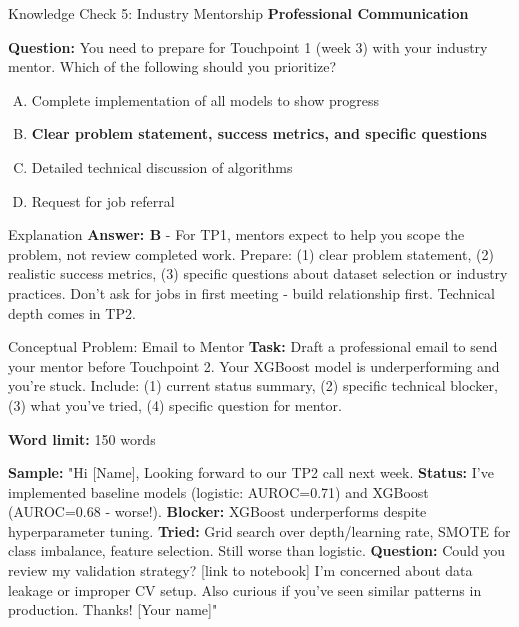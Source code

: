 
\begin{frame}{Knowledge Check 5: Industry Mentorship}
\textbf{Professional Communication}

\vspace{0.3cm}

\textbf{Question:} You need to prepare for Touchpoint 1 (week 3) with your industry mentor. Which of the following should you prioritize?

\begin{enumerate}[A)]
\item Complete implementation of all models to show progress
\item \textcolor{forest}{\textbf{Clear problem statement, success metrics, and specific questions}}
\item Detailed technical discussion of algorithms
\item Request for job referral
\end{enumerate}

\pause

\begin{block}{Explanation}
\textcolor{forest}{\textbf{Answer: B}} - For TP1, mentors expect to help you scope the problem, not review completed work. Prepare: (1) clear problem statement, (2) realistic success metrics, (3) specific questions about dataset selection or industry practices. Don't ask for jobs in first meeting - build relationship first. Technical depth comes in TP2.
\end{block}

\pause

\vspace{0.2cm}

\begin{block}{Conceptual Problem: Email to Mentor}
\textbf{Task:} Draft a professional email to send your mentor before Touchpoint 2. Your XGBoost model is underperforming and you're stuck. Include: (1) current status summary, (2) specific technical blocker, (3) what you've tried, (4) specific question for mentor.

\textbf{Word limit:} 150 words

\pause

\small
\textbf{Sample:} "Hi [Name], Looking forward to our TP2 call next week. \textbf{Status:} I've implemented baseline models (logistic: AUROC=0.71) and XGBoost (AUROC=0.68 - worse!). \textbf{Blocker:} XGBoost underperforms despite hyperparameter tuning. \textbf{Tried:} Grid search over depth/learning rate, SMOTE for class imbalance, feature selection. Still worse than logistic. \textbf{Question:} Could you review my validation strategy? [link to notebook] I'm concerned about data leakage or improper CV setup. Also curious if you've seen similar patterns in production. Thanks! [Your name]"
\end{block}
\end{frame}

